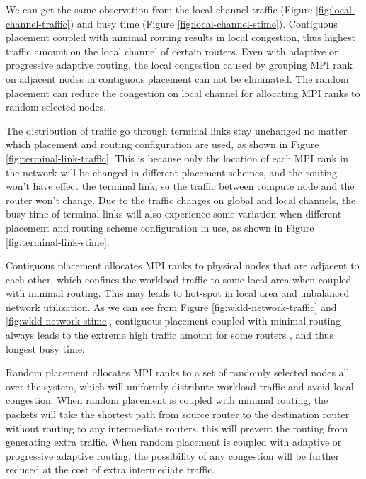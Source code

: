 \documentclass[conference,compsoc]{IEEEtran}
\newcommand{\NOTE}[1]{\hl {NOTE: #1}}
\begin{document}

We can get the same observation from the local channel traffic (Figure \ref{fig:local-channel-traffic}) and busy time (Figure \ref{fig:local-channel-stime}). Contiguous placement coupled with minimal routing results in local congestion, thus highest traffic amount on the local channel of certain routers. Even with adaptive or progressive adaptive routing, the local congestion caused by grouping MPI rank on adjacent nodes in contiguous placement can not be eliminated. The random placement can reduce the congestion on local channel for allocating MPI ranks to random selected nodes. 

The distribution of traffic go through terminal links stay unchanged no matter which placement and routing configuration are used, as shown in Figure \ref{fig:terminal-link-traffic}. This is because only the location of each MPI rank in the network will be changed in different placement schemes, and the routing won't have effect the terminal link, so the traffic between compute node and the router won't change. Due to the traffic changes on global and local channels, the busy time of terminal links will also experience some variation when different placement and routing scheme configuration in use, as shown in Figure \ref{fig:terminal-link-stime}. 


 

Contiguous placement allocates MPI ranks to physical nodes that are adjacent to each other, which confines the workload traffic to some local area when coupled with minimal routing. This may leads to hot-spot in local area and unbalanced network utilization. As we can see from Figure \ref{fig:wkld-network-traffic} and \ref{fig:wkld-network-stime}, contiguous placement coupled with minimal routing always leads to the extreme high traffic amount for some routers , and thus longest busy time.

Random placement allocates MPI ranks to a set of randomly selected nodes all over the system, which will uniformly distribute workload traffic and avoid local congestion. When random placement is coupled with minimal routing, the packets will take the shortest path from source router to the destination router without routing to any intermediate routers, this will prevent the routing from generating extra traffic. When random placement is coupled with adaptive or progressive adaptive routing, the possibility of any congestion will be further reduced at the cost of extra intermediate traffic. 
\end{document}
